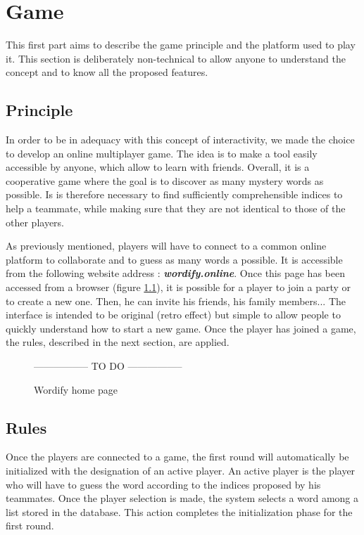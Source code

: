 \documentclass{tnreport}
\begin{document}
\chapter{Game}

This first part aims to describe the game principle and the platform used to play it. This section is deliberately non-technical to allow anyone to understand the concept and to know all the proposed features. 

\section{Principle}

In order to be in adequacy with this concept of interactivity, we made the choice to develop an online multiplayer game. The idea is to make a tool easily accessible by anyone, which allow to learn with friends. Overall, it is a cooperative game where the goal is to discover as many mystery words as possible. Is is therefore necessary to find sufficiently comprehensible indices to help a teammate, while making sure that they are not identical to those of the other players.

As previously mentioned, players will have to connect to a common online platform to collaborate and to guess as many words a possible. It is accessible from the following website address : \textbf{\textit{wordify.online}}. Once this page has been accessed from a browser (figure \ref{fig:wordify_home_page}), it is possible for a player to join a party or to create a new one. Then, he can invite his friends, his family members... The interface is intended to be original (retro effect) but simple to allow people to quickly understand how to start a new game. Once the player has joined a game, the rules, described in the next section, are applied. 

\begin{figure}[ht]
	\centering
	\fboxsep=1.2pt
	----------------- TO DO -----------------
	\label{fig:wordify_home_page}
	\caption{Wordify home page}
\end{figure} 

\section{Rules}

Once the players are connected to a game, the first round will automatically be initialized with the designation of an active player. An active player is the player who will have to guess the word according to the indices proposed by his teammates. Once the player selection is made, the system selects a word among a list stored in the database. This action completes the initialization phase for the first round. 
\end{document}
